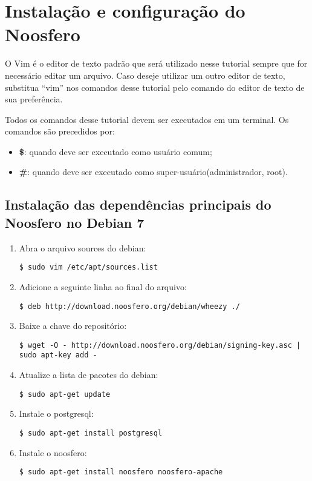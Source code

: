 \lstset{language=sh, numbers=none, breaklines=true}
\chapter{Instalação e configuração do Noosfero }

O Vim é o editor de texto padrão que será utilizado nesse tutorial sempre que for necessário editar um arquivo. Caso deseje utilizar um outro editor de texto, substitua “vim” nos comandos desse tutorial pelo comando do editor de texto de sua preferência.

Todos os comandos desse tutorial devem ser executados em um terminal. Os comandos são precedidos por:

\begin{itemize}
\item \textbf{\$}: quando deve ser executado como usuário comum;
\item \textbf{\#}: quando deve ser executado como super-usuário(administrador, root).
\end{itemize}

\section{Instalação das dependências principais do Noosfero no Debian 7}

\begin{enumerate}[label=\alph*)]

\item Abra o arquivo sources do debian:
\begin{lstlisting}
$ sudo vim /etc/apt/sources.list
\end{lstlisting}

\item Adicione a seguinte linha ao final do arquivo:
\begin{lstlisting}
$ deb http://download.noosfero.org/debian/wheezy ./
\end{lstlisting}

\item Baixe a chave do repositório:
\begin{lstlisting}[numbers=none, breaklines=true]
$ wget -O - http://download.noosfero.org/debian/signing-key.asc | sudo apt-key add -
\end{lstlisting}

\item Atualize a lista de pacotes do debian:
\begin{lstlisting}
$ sudo apt-get update
\end{lstlisting}

\item Instale o postgresql:
\begin{lstlisting}
$ sudo apt-get install postgresql
\end{lstlisting}

\item Instale o noosfero:
\begin{lstlisting}
$ sudo apt-get install noosfero noosfero-apache
\end{lstlisting}

\end{enumerate}

